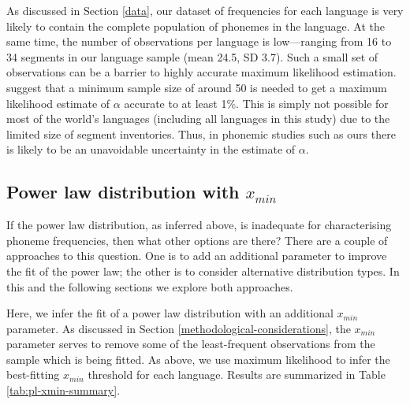 As discussed in Section \ref{data}, our dataset of frequencies for each language is very likely to contain the complete population of phonemes in the language. At the same time, the number of observations per language is low---ranging from 16 to 34 segments in our language sample (mean 24.5, SD 3.7). Such a small set of observations can be a barrier to highly accurate maximum likelihood estimation. \textcite[p.~669]{clauset_power-law_2009} suggest that a minimum sample size of around 50 is needed to get a maximum likelihood estimate of \(\alpha\) accurate to at least 1\%. This is simply not possible for most of the world's languages (including all languages in this study) due to the limited size of segment inventories. Thus, in phonemic studies such as ours there is likely to be an unavoidable uncertainty in the estimate of \(\alpha\).

\hypertarget{power-law-xmin-results}{%
\subsection{\texorpdfstring{Power law distribution with \(x_{min}\)}{Power law distribution with x\_\{min\}}}\label{power-law-xmin-results}}

If the power law distribution, as inferred above, is inadequate for characterising phoneme frequencies, then what other options are there? There are a couple of approaches to this question. One is to add an additional parameter to improve the fit of the power law; the other is to consider alternative distribution types. In this and the following sections we explore both approaches.

Here, we infer the fit of a power law distribution with an additional \(x_{min}\) parameter. As discussed in Section \ref{methodological-considerations}, the \(x_{min}\) parameter serves to remove some of the least-frequent observations from the sample which is being fitted. As above, we use maximum likelihood to infer the best-fitting \(x_{min}\) threshold for each language. Results are summarized in Table \ref{tab:pl-xmin-summary}.

